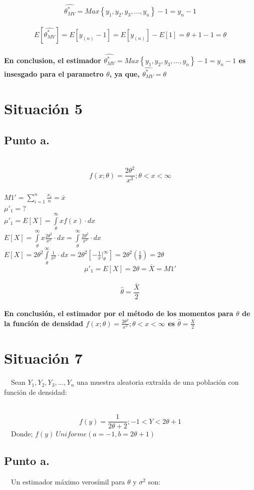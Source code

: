 \documentclass[letterpaper,12pt,onecolumn,titlepage]{article}
\begin{document}
~\\ $$\hat{\theta^*_{MV}}=Max\left\lbrace{y_{1},y_{2},y_{3},...,y_{n}}\right\rbrace - 1 = y_{n}-1$$
~\\ $$E[\hat{\theta^*_{MV}}]=E[y_{(n)}-1]=E[y_{(n)}]-E[1]=\theta+1-1=\theta$$
~\\ \textbf{En conclusion, el estimador $\hat{\theta^*_{MV}}=Max\left\lbrace{y_{1},y_{2},y_{3},...,y_{n}}\right\rbrace - 1 = y_{n}-1$ es insesgado para el parametro $\theta$, ya que, $\hat{\theta^*_{MV}}=\theta$ } 
\pagebreak\section{Situaci\'{o}n 5}
\subsection{Punto a.}
~\\ $$f(x;\theta) = \frac{2\theta^2}{x^3} ; \theta<x<\infty $$
~\\ $M1'=\sum_{i=1}^{n}\frac{x_{i}}{n}=\bar{x}$
~\\ $\mu'_1 =?$
~\\ $\mu'_1=E[X]= \int \limits_{\theta}^{\infty} x f(x) \cdot dx$
~\\ $E[X]=\int \limits_{\theta}^{\infty} x \frac{2\theta^2}{x^3}\cdot dx=\int \limits_{\theta}^{\infty}\frac{2\theta^2}{x^2}\cdot dx$
~\\ $E[X]=2\theta^2 \int \limits_{\theta}^{\infty}\frac{1}{x^2}\cdot dx= 2\theta^2[-\frac{1}{x}|_{\theta}^{\infty}]=2\theta^2(\frac{1}{\theta})=2\theta$
~\\ $$\mu'_1=E[X]=2\theta=\bar{X}=M1'$$
~\ $$\hat{\theta}=\frac{\bar{X}}{2}$$
~\\ \textbf{En conclusi\'{o}n, el estimador por el m\'{e}todo de los momentos para $\theta$ de la funci\'{o}n de densidad $f(x;\theta) = \frac{2\theta^2}{x^3} ; \theta<x<\infty $ es $\hat{\theta}=\frac{\bar{X}}{2}$}


\pagebreak\section{Situaci\'{o}n 7}
~\ Sean $Y_{1}, Y_{2}, Y_{3},...,Y_{n}$ una muestra aleatoria extra\'{i}da de una poblaci\'{o}n con funci\'{o}n de densidad:

~\ $$f({y})= \frac{1}{2\theta +2}  ;  -1<Y<2\theta+1$$
~\ Donde; $f({y}) ~ Uniforme(a=-1,b=2\theta+1)$

\subsection{Punto a.}
~\ Un estimador m\'{a}ximo veros\'{i}mil para $\theta$ y $\sigma^{2}$ son:
\end{document}
